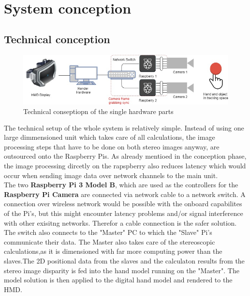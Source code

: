 \chapter{System conception}\section{Technical conception}
\begin{figure}[H]
\includegraphics[width=\textwidth]{images/technical_setup.jpg}
\caption{Technical conseptiopn of the single hardware parts}
\label{technical-copnception}
\end{figure} 
The technical setup of the whole system is relatively simple. Instead of using one large dimmensioned unit which takes care of all calculations, the image processing steps that have to be done on both stereo images anyway, are outsourced onto the Raspberry Pis. As already mentioed in the conception phase, the image processing dircetly on the rapspberry also reduces latency which would occur when sending image data over network channels to the main unit.\\
The two \textbf{Raspberry Pi 3 Model B}, which are used as the controllers for the \textbf{Raspberry Pi Camera} are connected via network cable to a network switch. A connection over wireless network would be possible with the onboard capabilites of the  Pi's, but this might encounter latency problems and/or signal interference with other exisitng networks. Therefor a cable connection is the safer solution.
The switch also connects to the "Master" PC to which the "Slave" Pi's communicate their data. The Master also takes care of the stereoscopic calculations,as it is dimensioned with far more computing power than the slaves.The 2D positional data from the slaves and the calculaton results from the stereo image disparity is fed into the hand model running on the "Master". The model solution is then applied to the digital hand model and rendered to the HMD.
